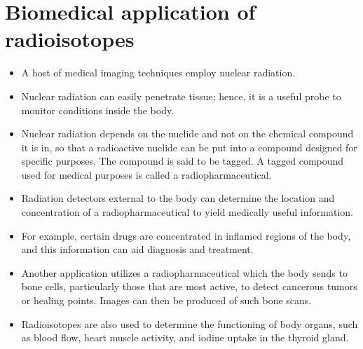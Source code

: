 \documentclass[12pt]{book}
\begin{document}
\chapter{Biomedical application of radioisotopes}
\begin{itemize}
\item
A host of medical imaging techniques employ nuclear radiation.

\item Nuclear radiation can easily penetrate tissue; hence, it is a useful probe to monitor conditions inside the body.

\item Nuclear radiation depends on the nuclide and not on the chemical compound it is in, so that a radioactive nuclide can be put into a compound designed for specific purposes. The compound is said to be tagged. A tagged compound used for medical purposes is called a radiopharmaceutical.

\item Radiation detectors external to the body can determine the location and concentration of a radiopharmaceutical to yield medically useful information.

\item For example, certain drugs are concentrated in inflamed regions of the body, and this information can aid diagnosis and treatment.

\item Another application utilizes a radiopharmaceutical which the body sends to bone cells, particularly those that are most active, to detect cancerous tumors or healing points. Images can then be produced of such bone scans.

\item  Radioisotopes are also used to determine the functioning of body organs, such as blood flow, heart muscle activity, and iodine uptake in the thyroid gland.

\end{itemize}
\end{document}
